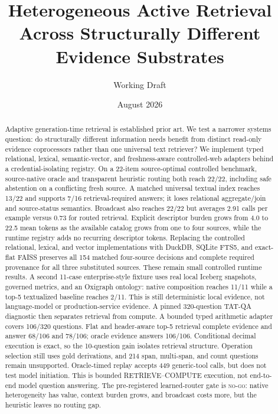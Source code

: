\documentclass[11pt]{article}
\title{Heterogeneous Active Retrieval Across Structurally Different Evidence Substrates}
\author{Working Draft}\date{August 2026}
\begin{document}
\maketitle

\begin{abstract}
Adaptive generation-time retrieval is established prior art. We test a narrower
systems question: do structurally different information needs benefit from
distinct read-only evidence coprocessors rather than one universal text
retriever? We implement typed relational, lexical, semantic-vector, and
freshness-aware controlled-web adapters behind a credential-isolating registry.
On a 22-item source-optimal controlled benchmark, source-native oracle and
transparent heuristic routing both reach 22/22, including safe abstention on a
conflicting fresh source. A matched universal textual index reaches 13/22 and
supports 7/16 retrieval-required answers; it loses relational aggregate/join and
source-status semantics. Broadcast also reaches 22/22 but averages 2.91 calls per
example versus 0.73 for routed retrieval. Explicit descriptor burden grows from
4.0 to 22.5 mean tokens as the available catalog grows from one to four sources,
while the runtime registry adds no recurring descriptor tokens. Replacing the
controlled relational, lexical, and vector implementations with DuckDB, SQLite
FTS5, and exact-flat FAISS preserves all 154 matched four-source decisions and
complete required provenance for all three substituted sources. These remain
small controlled runtime results. A second 11-case enterprise-style fixture uses
real local Iceberg snapshots, governed metrics, and an Oxigraph ontology: native
composition reaches 11/11 while a top-5 textualized baseline reaches 2/11. This
is still deterministic local evidence, not language-model or production-service
evidence. A pinned 320-question TAT-QA diagnostic then separates retrieval from
compute. A bounded typed arithmetic adapter covers 106/320 questions. Flat and
header-aware top-5 retrieval complete evidence and answer 68/106 and 78/106;
oracle evidence answers 106/106. Conditional decimal execution is exact, so the
10-question gain isolates retrieval structure. Operation selection still uses
gold derivations, and 214 span, multi-span, and count questions remain
unsupported. Oracle-timed replay accepts 449 generic-tool calls, but does not
test model initiation. This is bounded RETRIEVE--COMPUTE execution, not
end-to-end model question answering. The
pre-registered
learned-router gate is \textsc{no-go}: native heterogeneity has value, context
burden grows, and broadcast costs more, but the heuristic leaves no routing gap.
\end{abstract}
\end{document}
